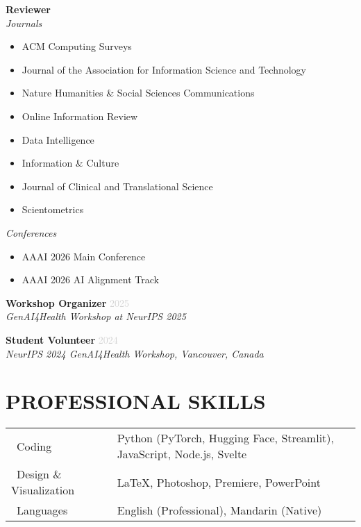 \documentclass[a4paper,9pt]{extarticle}
\newcommand{\role}[1]{\textbf{\color{darkgray}#1}}
\newcommand{\institution}[1]{\textit{#1}}
\newcommand{\daterange}[1]{\textcolor{lightgray}{#1}}
\newcommand{\icon}[1]{\makebox[1.4em][c]{\raisebox{-0.2ex}{#1}}}
\begin{document}
\noindent
\role{Reviewer} \\
\institution{Journals}
\begin{itemize}[leftmargin=1em]
\item ACM Computing Surveys
\item Journal of the Association for Information Science and Technology
\item Nature Humanities \& Social Sciences Communications
\item Online Information Review
\item Data Intelligence
\item Information \& Culture
\item Journal of Clinical and Translational Science
\item Scientometrics
\end{itemize}

\noindent
\institution{Conferences}
\begin{itemize}[leftmargin=1em]
\item AAAI 2026 Main Conference
\item AAAI 2026 AI Alignment Track
\end{itemize}

\vspace{0.4cm}
\noindent
\role{Workshop Organizer} \hfill \daterange{2025} \\
\institution{GenAI4Health Workshop at NeurIPS 2025}



\vspace{0.4cm}
\noindent
\role{Student Volunteer} \hfill \daterange{2024} \\
\institution{NeurIPS 2024 GenAI4Health Workshop, Vancouver, Canada}



\section*{PROFESSIONAL SKILLS}

\noindent
\begin{tabular}{L{3cm} R{12cm}}
\icon{\faCode}\ Coding & Python (PyTorch, Hugging Face, Streamlit), JavaScript, Node.js, Svelte \\[0.3em]
\icon{\faPaintBrush}\ Design \& Visualization & LaTeX, Photoshop, Premiere, PowerPoint \\[0.3em]
\icon{\faLanguage}\ Languages & English (Professional), Mandarin (Native) \\
\end{tabular}
\end{document}
